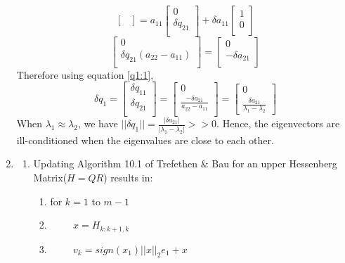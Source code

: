 \documentclass{article}
\begin{document}
\begin{enumerate}
$$\begin{bmatrix}
    \end{bmatrix} = a_{11}\begin{bmatrix}
        0\\
        \delta q_{21}\\
    \end{bmatrix} + \delta a_{11}\begin{bmatrix}
        1\\
        0\\
    \end{bmatrix}$$
    $$\begin{bmatrix}
        0\\
        \delta q_{21}(a_{22} - a_{11})\\
    \end{bmatrix} = \begin{bmatrix}
        0\\
        -\delta a_{21}\\
    \end{bmatrix}$$
    Therefore using equation \ref{q1:1},
    $$\delta q_1 = \begin{bmatrix}
        \delta q_{11}\\
        \delta q_{21}\\
    \end{bmatrix} = \begin{bmatrix}
        0\\
        \frac{-\delta a_{21}}{a_{22} - a_{11}}\\
    \end{bmatrix} = \begin{bmatrix}
        0\\
        \frac{\delta a_{21}}{\lambda_1 - \lambda_2}
    \end{bmatrix}$$
    When $\lambda_1 \approx \lambda_2$, we have $||\delta q_1|| = \frac{|\delta a_{21}|}{|\lambda_1 - \lambda_2|} >> 0$. Hence, the eigenvectors are ill-conditioned when the eigenvalues are close to each other.
    \item \begin{enumerate}[label=(\alph*)]
    \item Updating Algorithm 10.1 of Trefethen \& Bau for an upper Hessenberg Matrix($H = QR$) results in:
    \begin{enumerate}
        \item for $k = 1$ to $m - 1$
        \item $\qquad$ $x = H_{k : k + 1, k}$
        \item $\qquad$ $v_k = sign(x_1)||x||_2e_1 + x$

\end{enumerate}
\end{enumerate}
\end{enumerate}
\end{document}

